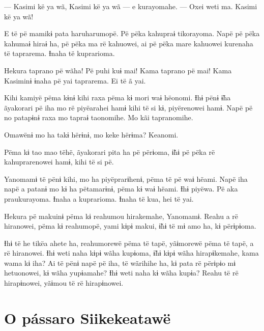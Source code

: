 --- Kasimi kë ya wã, Kasimi kë ya wã --- e kurayomahe. --- Oxei weti ma.
Kasimi kë ya wã! 

E të pë mamikɨ pata haruharumopë. Pë pëka kahupraɨ tikorayoma. Napë pë
 pëka kahumaɨ hiraɨ ha, pë pëka ma rë kahuowei, ai pë pëka mare kahuowei
 kurenaha të taprarema. Ɨnaha të kuprarioma.

Hekura taprano pë wãha! Pë puhi kuɨ mai! Kama taprano pë mai! Kama
Kasiminɨ ɨnaha pë yai taprarema. Ei të ã yai. 


Kihi kamiyë pëma kɨnɨ kihi raxa pëma kɨ mori waɨ hëonomi. Ɨhɨ pënɨ ɨ̃ha
ãyakorari pë iha mo rë piyëarahei hamɨ kihi të si kɨ, piyërenowei hamɨ.
Napë pë no patapɨnɨ raxa mo tapraɨ taonomihe. Mo kãi tapranomihe. 

Omawënɨ mo ha takɨ hërɨnɨ, mo keke hërɨma? Keanomi. 

Pëma kɨ tao mao tëhë, ãyakorari pita ha pë përɨoma, ɨ̃hɨ pë pëka rë
kahuprarenowei hamɨ, kihi të si pë. 


Yanomamɨ të pënɨ kihi, mo ha piyëprarɨhenɨ, pëma të pë waɨ hëami. Napë
iha napë a patanɨ mo kɨ ha pëtamarɨnɨ, pëma kɨ waɨ hëami. Ɨhɨ piyëwa. Pë
aka praukurayoma. Ɨnaha a kuprarioma. Ɨnaha të kua, hei të yai. 

Hekura pë makuinɨ pëma kɨ reahumou hirakemahe, Yanomamɨ. Reahu a rë
hiranowei, pëma kɨ reahumopë, yami kɨpɨ makui, ɨ̃hɨ të mɨ amo ha, kɨ
përɨpɨoma. 

Ɨhɨ të he tikëa ahete ha, reahumorewë pëma të tapë, yãɨmorewë pëma të
tapë, a rë hiranowei. Ɨhɨ weti naha kɨpɨ wãha kupɨoma, ɨ̃hɨ kɨpɨ wãha
hirapɨkemahe, kama wama kɨ iha? Ai të pënɨ napë pë iha, të wãrihihe ha,
kɨ pata rë përɨpɨo mɨ hetuonowei, kɨ wãha yupɨamahe? Ɨhɨ weti naha kɨ
wãha kupɨa? Reahu të rë hirapɨnowei, yãɨmou të rë hirapɨnowei. 

\chapter{O pássaro Siikekeatawë}
 
